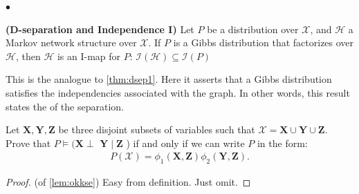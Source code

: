 \documentclass{article}
\newcommand{\bfs}[1]{\textbf{({#1}) }}
\begin{document}
$\bullet$ 
\begin{thma}\bfs{D-separation and Independence I}\label{thm:sep1}
Let $P$ be a distribution over $\mathcal{X}$, and $\mathcal{H}$ a Markov network structure over $\mathcal{X}$. If $P$ is a Gibbs distribution that factorizes over $\mathcal{H}$, then $\mathcal{H}$ is an I-map for $P$: $\mathcal{I}(\mathcal{H}) \subseteq \mathcal{I}(P)$
\end{thma}
\begin{rema}
This is the analogue to \cref{thm:dsep1}. Here it asserts that a Gibbs distribution  satisfies the independencies associated with the graph. In other words, this result states the  of the separation.
\end{rema}
\begin{lema}\label{lem:okkse}
Let $\boldsymbol{X}, \boldsymbol{Y}, \boldsymbol{Z}$ be three disjoint subsets of variables such that $\mathcal{X}=\boldsymbol{X} \cup \boldsymbol{Y} \cup \boldsymbol{Z}$. Prove that $P \models(\boldsymbol{X} \perp$ $\boldsymbol{Y} \mid \boldsymbol{Z}$ ) if and only if we can write $P$ in the form:
\begin{align*}
P(\mathcal{X})=\phi_{1}(\boldsymbol{X}, \boldsymbol{Z}) \phi_{2}(\boldsymbol{Y}, \boldsymbol{Z}) .
\end{align*}
\end{lema}
\begin{proof} (of \cref{lem:okkse})
 Easy from definition. Just omit.
\end{proof}
\end{document}
